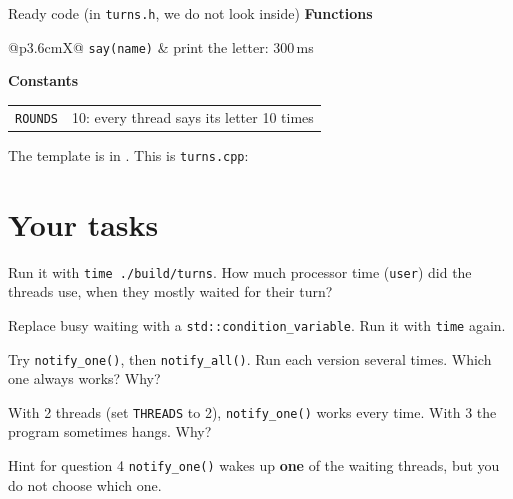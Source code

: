 \begin{note}{Ready code (in \texttt{turns.h}, we do not look inside)}
\textbf{Functions}\\[2pt]
\begin{tabularx}{\linewidth}{@{}p{3.6cm}X@{}}
\texttt{say(name)} & print the letter: 300\,ms \\
\end{tabularx}
\par\smallskip\textbf{Constants}\\[2pt]
\begin{tabularx}{\linewidth}{@{}p{3.6cm}X@{}}
\texttt{ROUNDS} & 10: every thread says its letter 10 times \\
\end{tabularx}
\end{note}

\codesection

The template is in . This is \texttt{turns.cpp}:


\runline

\section{Your tasks}

\begin{questions}
  \item Run it with \texttt{time ./build/turns}. How much processor time (\texttt{user}) did the threads use,
        when they mostly waited for their turn?
  \item Replace busy waiting with a \texttt{std::condition\_variable}. Run it with \texttt{time} again.
  \item Try \texttt{notify\_one()}, then \texttt{notify\_all()}. Run each version several times.
        Which one always works? Why?
  \item With 2 threads (set \texttt{THREADS} to 2), \texttt{notify\_one()} works every time. With 3 the program
        sometimes hangs. Why?
\end{questions}

\begin{note}{Hint for question 4}
\texttt{notify\_one()} wakes up \textbf{one} of the waiting threads, but you do not choose which one.
\end{note}
